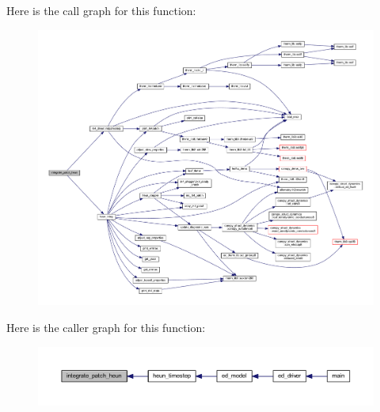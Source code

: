 Here is the call graph for this function\+:\nopagebreak
\begin{figure}[H]
\begin{center}
\leavevmode
\includegraphics[width=350pt]{heun__driver_8f90_a2020e0df05ff5e04a48f6a7adc08f39a_cgraph}
\end{center}
\end{figure}




Here is the caller graph for this function\+:\nopagebreak
\begin{figure}[H]
\begin{center}
\leavevmode
\includegraphics[width=350pt]{heun__driver_8f90_a2020e0df05ff5e04a48f6a7adc08f39a_icgraph}
\end{center}
\end{figure}



